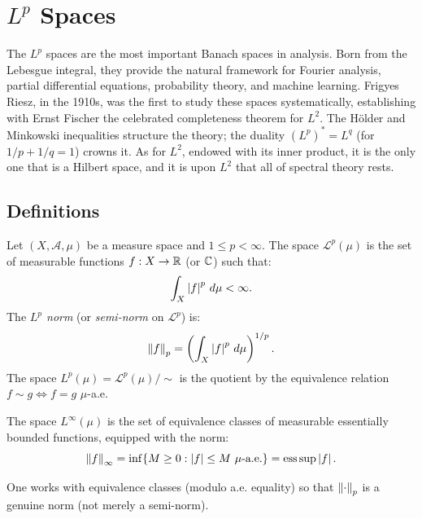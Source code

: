 \chapter{$L^p$ Spaces}
\label{ch:lp_spaces}

The $L^p$ spaces are the most important Banach spaces in analysis. Born from the Lebesgue integral, they provide the natural framework for Fourier analysis, partial differential equations, probability theory, and machine learning. Frigyes Riesz, in the 1910s, was the first to study these spaces systematically, establishing with Ernst Fischer the celebrated completeness theorem for $L^2$. The H\"older and Minkowski inequalities structure the theory; the duality $(L^p)^* = L^q$ (for $1/p + 1/q = 1$) crowns it. As for $L^2$, endowed with its inner product, it is the only one that is a Hilbert space, and it is upon $L^2$ that all of spectral theory rests.

\section{Definitions}

\begin{definition}[$L^p$ space]
Let $(X, \mathcal{A}, \mu)$ be a measure space and $1 \leq p < \infty$. The space
$\mathcal{L}^p(\mu)$ is the set of measurable functions $f : X \to \mathbb{R}$ (or $\mathbb{C}$)
such that:
\[
\int_X \left| f \right|^p\, d\mu < \infty.
\]
The \emph{$L^p$ norm} (or \emph{semi-norm} on $\mathcal{L}^p$) is:
\[
\left\| f \right\|_p = \left(\int_X \left| f \right|^p\, d\mu\right)^{1/p}.
\]
The space $L^p(\mu) = \mathcal{L}^p(\mu) / \sim$ is the quotient by the equivalence
relation $f \sim g \iff f = g$ $\mu$-a.e.
\end{definition}

\begin{definition}
The space $L^\infty(\mu)$ is the set of equivalence classes of measurable
essentially bounded functions, equipped with the norm:
\[
\left\| f \right\|_\infty = \inf\{M \geq 0 : \left| f \right| \leq M \text{ $\mu$-a.e.}\}
= \operatorname{ess\,sup} \left| f \right|.
\]
\end{definition}

\begin{remark}
One works with equivalence classes (modulo a.e. equality) so that $\left\| \cdot \right\|_p$
is a genuine norm (not merely a semi-norm).
\end{remark}

